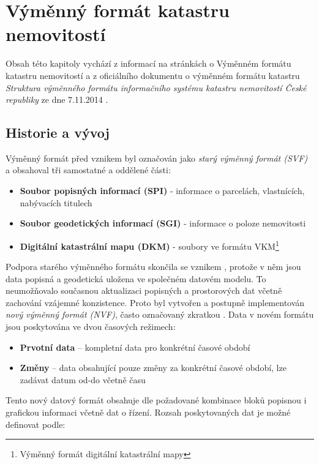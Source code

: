 \section{Výměnný formát katastru nemovitostí}
Obsah této kapitoly vychází z informací na stránkách  o
Výměnném formátu katastru nemovitostí a z oficiálního dokumentu o
výměnném formátu katastru \textit{Struktura výměnného formátu
  informačního systému katastru nemovitostí České republiky} ze dne
7.11.2014 \cite{struktura_ISKN}.
\subsection{Historie a vývoj}
Výměnný formát před vznikem  byl označován jako \textit{starý
  výměnný formát (SVF)} a obsahoval tři samostatné a oddělené části:
\begin{itemize}[leftmargin=50pt]
	\item \textbf{Soubor popisných informací (SPI)} - informace o parcelách, vlastnících, nabývacích titulech
	\item \textbf{Soubor geodetických informací (SGI)} - informace o poloze nemovitosti
	\item \textbf{Digitální katastrální mapu (DKM)} - soubory ve formátu VKM\footnote{Výměnný formát digitální katastrální mapy}
\end{itemize}
Podpora starého výměnného formátu skončila se vznikem ,
protože v něm jsou data popisná a geodetická uložena ve společném
datovém modelu. To neumožňovalo současnou aktualizaci popisných a
prostorových dat včetně zachování vzájemné konzistence. Proto byl
vytvořen a postupně implementován \textit{nový výměnný formát (NVF)},
často označovaný zkratkou . Data v novém formátu jsou
poskytována ve dvou časových režimech:

\begin{itemize}[leftmargin=50pt]
\item \textbf{Prvotní data} -- kompletní data pro konkrétní časové období						
\item \textbf{Změny} -- data obsahující pouze změny za konkrétní časové období, lze zadávat datum od-do včetně času					 
\end{itemize}
Tento nový datový formát obsahuje dle požadované kombinace bloků
popisnou i grafickou informaci včetně dat o řízení. Rozsah
poskytovaných dat je možné definovat podle:


